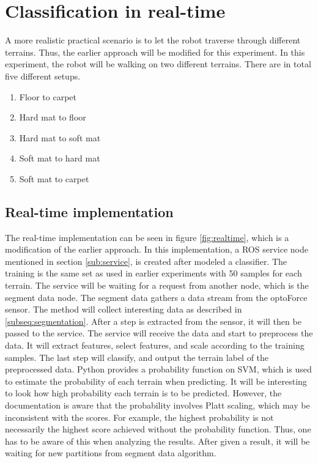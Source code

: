 \documentclass[USenglish]{ifimaster}  %
\begin{document}
\section{Classification in real-time} \label{sec:realtime}
A more realistic practical scenario is to let the robot traverse through different terrains. Thus, the earlier approach will be modified for this experiment. In this experiment, the robot will be walking on two different terrains. There are in total five different setups.
	
	
	\begin{enumerate}
		\item Floor to carpet
		\item Hard mat to floor
		\item Hard mat to soft mat
		\item Soft mat to hard mat
		\item Soft mat to carpet
	\end{enumerate}
	
\subsection{Real-time implementation} %
The real-time implementation can be seen in figure \ref{fig:realtime}, which is a modification of the earlier approach. In this implementation, a ROS service node mentioned in section \ref{sub:service}, is created after modeled a classifier. The training is the same set as used in earlier experiments with 50 samples for each terrain. The service will be waiting for a request from another node, which is the segment data node. The segment data gathers a data stream from the optoForce sensor. The method will collect interesting data as described in \ref{subseq:segmentation}. After a step is extracted from the sensor, it will then be passed to the service. The service will receive the data and start to preprocess the data. It will extract features, select features, and scale according to the training samples. The last step will classify, and output the terrain label of the preprocessed data. Python provides a probability function on SVM, which is used to estimate the probability of each terrain when predicting. It will be interesting to look how high probability each terrain is to be predicted. However, the documentation is aware that the probability involves Platt scaling, which may be inconsistent with the scores. For example, the highest probability is not necessarily the highest score achieved without the probability function. Thus, one has to be aware of this when analyzing the results. After given a result, it will be waiting for new partitions from segment data algorithm.
	
\end{document}
